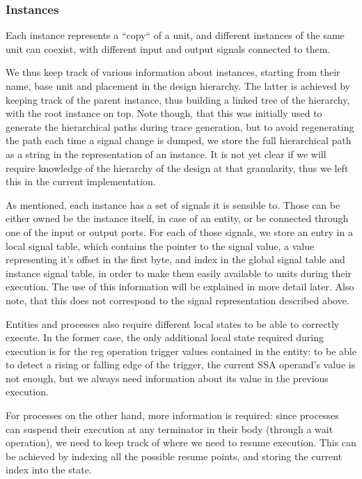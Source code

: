 \subsubsection{Instances}
Each instance represents a “copy“ of a unit, and different instances of the same unit can coexist, with different input and output signals connected to them.

We thus keep track of various information about instances, starting from their name, base unit and placement in the design hierarchy. The latter is achieved by keeping track of the parent instance, thus building a linked tree of the hierarchy, with the root instance on top. Note though, that this was initially used to generate the hierarchical paths during trace generation, but to avoid regenerating the path each time a signal change is dumped, we store the full hierarchical path as a string in the representation of an instance. It is not yet clear if we will require knowledge of the hierarchy of the design at that granularity, thus we left this in the current implementation.

As mentioned, each instance has a set of signals it is sensible to. Those can be either owned be the instance itself, in case of an entity, or be connected through one of the input or output ports. For each of those signals, we store an entry in a local signal table, which contains the pointer to the signal value, a value representing it's offset in the first byte, and index in the global signal table and instance signal table, in order to make them easily available to units during their execution. The use of this information will be explained in more detail later. Also note, that this does not correspond to the signal representation described above.

Entities and processes also require different local states to be able to correctly execute. In the former case, the only additional local state required during execution is for the reg operation trigger values contained in the entity: to be able to detect a rising or falling edge of the trigger, the current SSA operand's value is not enough, but we always need information about its value in the previous execution.

For processes on the other hand, more information is required: since processes can suspend their execution at any terminator in their body (through a wait operation), we need to keep track of where we need to resume execution. This can be achieved by indexing all the possible resume points, and storing the current index into the state.

